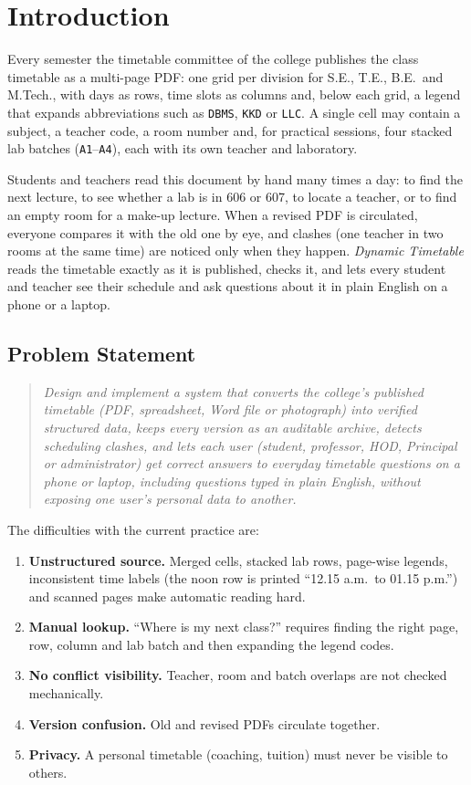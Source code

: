 \section{Introduction}
Every semester the timetable committee of the college publishes the class timetable as a multi-page
PDF: one grid per division for S.E., T.E., B.E.\ and M.Tech., with days as rows, time slots as
columns and, below each grid, a legend that expands abbreviations such as \texttt{DBMS}, \texttt{KKD}
or \texttt{LLC}. A single cell may contain a subject, a teacher code, a room number and, for practical
sessions, four stacked lab batches (\texttt{A1}--\texttt{A4}), each with its own teacher and laboratory.

Students and teachers read this document by hand many times a day: to find the next lecture, to see
whether a lab is in 606 or 607, to locate a teacher, or to find an empty room for a make-up lecture.
When a revised PDF is circulated, everyone compares it with the old one by eye, and clashes (one
teacher in two rooms at the same time) are noticed only when they happen. \emph{Dynamic Timetable}
reads the timetable exactly as it is published, checks it, and lets every student and teacher see
their schedule and ask questions about it in plain English on a phone or a laptop.

\subsection{Problem Statement}
\begin{quote}
\emph{Design and implement a system that converts the college's published timetable (PDF, spreadsheet,
Word file or photograph) into verified structured data, keeps every version as an auditable archive,
detects scheduling clashes, and lets each user (student, professor, HOD, Principal or administrator)
get correct answers to everyday timetable questions on a phone or laptop, including questions typed in
plain English, without exposing one user's personal data to another.}
\end{quote}
The difficulties with the current practice are:
\begin{enumerate}
\item \textbf{Unstructured source.} Merged cells, stacked lab rows, page-wise legends, inconsistent
      time labels (the noon row is printed ``12.15 a.m.\ to 01.15 p.m.'') and scanned pages make
      automatic reading hard.
\item \textbf{Manual lookup.} ``Where is my next class?'' requires finding the right page, row,
      column and lab batch and then expanding the legend codes.
\item \textbf{No conflict visibility.} Teacher, room and batch overlaps are not checked mechanically.
\item \textbf{Version confusion.} Old and revised PDFs circulate together.
\item \textbf{Privacy.} A personal timetable (coaching, tuition) must never be visible to others.
\end{enumerate}

